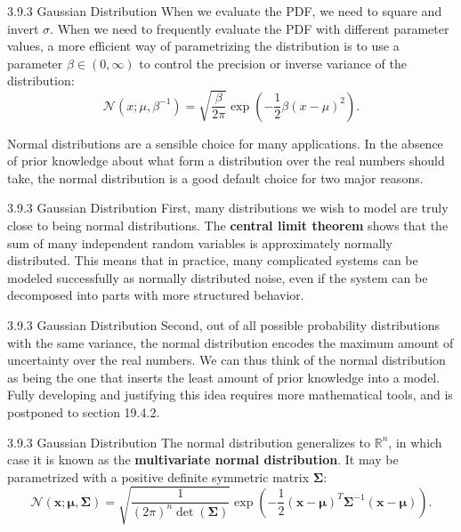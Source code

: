 \begin{frame}{3.9.3 Gaussian Distribution}
    \justifying
    When we evaluate the PDF, we need to square and invert $\sigma$. When we need to frequently evaluate the PDF with different parameter values, a more efficient way of parametrizing the distribution is to use a parameter $\beta \in (0, ∞)$ to control the precision or inverse variance of the distribution:
    \begin{equation}
        \mathcal{N}(x; \mu, \beta^{-1}) = \sqrt{\frac{\beta}{2\pi}} \exp\left(-\frac{1}{2} \beta (x - \mu)^{2}\right).
        \label{eq:3_22}
    \end{equation}
    
    Normal distributions are a sensible choice for many applications. In the absence of prior knowledge about what form a distribution over the real numbers should take, the normal distribution is a good default choice for two major reasons.
\end{frame}

\begin{frame}{3.9.3 Gaussian Distribution}
    \justifying
    First, many distributions we wish to model are truly close to being normal distributions. The \textbf{central limit theorem} shows that the sum of many independent random variables is approximately normally distributed. This means that in practice, many complicated systems can be modeled successfully as normally distributed noise, even if the system can be decomposed into parts with more structured behavior.
\end{frame}

\begin{frame}{3.9.3 Gaussian Distribution}
    \justifying
    Second, out of all possible probability distributions with the same variance, the normal distribution encodes the maximum amount of uncertainty over the real numbers. We can thus think of the normal distribution as being the one that inserts the least amount of prior knowledge into a model. Fully developing and justifying this idea requires more mathematical tools, and is postponed to section 19.4.2.
\end{frame}

\begin{frame}{3.9.3 Gaussian Distribution}
    \justifying
    The normal distribution generalizes to $\mathbb{R}^{n}$, in which case it is known as the \textbf{multivariate normal distribution}. It may be parametrized with a positive definite symmetric matrix $\boldsymbol{\Sigma}$:
    \begin{equation}
        \mathcal{N}(\boldsymbol{x}; \boldsymbol{\mu}, \boldsymbol{\Sigma}) = \sqrt{\frac{1}{(2 \pi)^{n} \det(\boldsymbol{\Sigma})}} \exp\left(-\frac{1}{2}(\boldsymbol{x} - \boldsymbol{\mu})^{T} \boldsymbol{\Sigma}^{-1} (\boldsymbol{x} - \boldsymbol{\mu})\right).
        \label{eq:3_23}
    \end{equation}
\end{frame}

